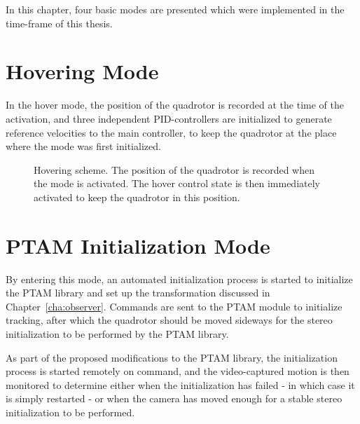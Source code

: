     In this chapter, four basic modes are presented which were implemented
    in the time-frame of this thesis.

    \section{Hovering Mode}
        In the hover mode, the position of the quadrotor is recorded at
        the time of the activation, and three independent PID-controllers
        are initialized to generate reference velocities to the main controller,
        to keep the quadrotor at the place where the mode was first initialized.
        \begin{figure}[H]
            \noindent{}
            \caption{Hovering scheme. The position of the quadrotor is recorded when the mode is activated. The hover control state is then immediately activated to keep the quadrotor in this position.}
            \label{fig:logic:hoverscheme}
        \end{figure}

    \section{PTAM Initialization Mode}
        By entering this mode, an automated initialization process is started to
        initialize the PTAM library and set up the transformation discussed in Chapter~\ref{cha:observer}.
        Commands are sent to the PTAM module to initialize tracking, after which
        the quadrotor should be moved sideways for the stereo
        initialization to be performed by the PTAM library.

        As part of the proposed modifications to the PTAM library, the
        initialization process is started remotely on command,
        and the video-captured motion is then monitored to determine either
        when the initialization has failed - in which case it is simply restarted -
        or when the camera has moved enough for a stable stereo initialization to be performed.

